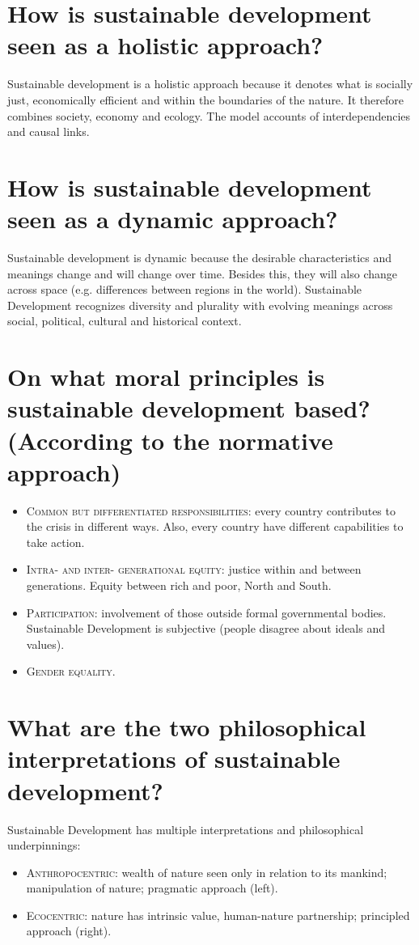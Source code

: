 \section{How is sustainable development seen as a holistic approach?}
Sustainable development is a 	holistic approach because it denotes what is socially just, economically efficient and within the boundaries of the nature. It therefore combines society, economy and ecology. The model accounts of interdependencies and causal links. 

\section{How is sustainable development seen as a dynamic approach?}
Sustainable development is dynamic because the desirable characteristics and meanings change and will change over time. Besides this, they will also change across space (e.g. differences between regions in the world). Sustainable Development recognizes diversity and plurality with evolving meanings across social, political, cultural and historical context. 

\section{On what moral principles is sustainable development based? (According to the normative approach)}
\begin{itemize}
\item \textsc{Common but differentiated responsibilities}: every country contributes to the crisis in different ways. Also, every country have different capabilities to take action. 
\item \textsc{Intra- and inter- generational equity}: justice within and between generations. Equity between rich and poor, North and South. 
\item \textsc{Participation}: involvement of those outside formal governmental bodies. Sustainable Development is subjective (people disagree about ideals and values).
\item \textsc{Gender equality}.
\end{itemize}

\section{What are the two philosophical interpretations of sustainable development?}
Sustainable Development has multiple interpretations and philosophical underpinnings:
\begin{itemize}
\item \textsc{Anthropocentric}: wealth of nature seen only in relation to its mankind; manipulation of nature; pragmatic approach (left).
\item \textsc{Ecocentric}: nature has intrinsic value, human-nature partnership; principled approach (right).
\end{itemize}

